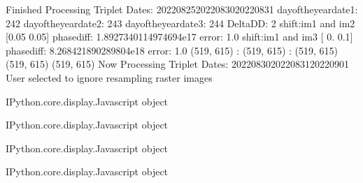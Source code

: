 \documentclass[letterpaper,10pt]{sphinxmanual}
\begin{document}
\begin{sphinxVerbatim}[commandchars=\\\{\}]
Finished Processing Triplet Dates:  20220825\PYGZhy{}20220830\PYGZhy{}20220831
day\PYGZus{}of\PYGZus{}the\PYGZus{}year\PYGZus{}date1:  242
\PYGZhy{}\PYGZhy{}\PYGZhy{}\PYGZhy{}\PYGZhy{}\PYGZhy{}\PYGZhy{}\PYGZhy{}\PYGZhy{}\PYGZhy{}\PYGZhy{}\PYGZhy{}\PYGZhy{}\PYGZhy{}\PYGZhy{}\PYGZhy{}\PYGZhy{}\PYGZhy{}\PYGZhy{}\PYGZhy{}\PYGZhy{}
day\PYGZus{}of\PYGZus{}the\PYGZus{}year\PYGZus{}date2:  243
\PYGZhy{}\PYGZhy{}\PYGZhy{}\PYGZhy{}\PYGZhy{}\PYGZhy{}\PYGZhy{}\PYGZhy{}\PYGZhy{}\PYGZhy{}\PYGZhy{}\PYGZhy{}\PYGZhy{}\PYGZhy{}\PYGZhy{}\PYGZhy{}\PYGZhy{}\PYGZhy{}\PYGZhy{}\PYGZhy{}\PYGZhy{}
day\PYGZus{}of\PYGZus{}the\PYGZus{}year\PYGZus{}date3:  244
\PYGZhy{}\PYGZhy{}\PYGZhy{}\PYGZhy{}\PYGZhy{}\PYGZhy{}\PYGZhy{}\PYGZhy{}\PYGZhy{}\PYGZhy{}\PYGZhy{}\PYGZhy{}\PYGZhy{}\PYGZhy{}\PYGZhy{}\PYGZhy{}\PYGZhy{}\PYGZhy{}\PYGZhy{}\PYGZhy{}\PYGZhy{}
Delta\PYGZus{}DD: 2
shift:im1 and im2 [\PYGZhy{}0.05 \PYGZhy{}0.05] phasediff: 1.8927340114974694e\PYGZhy{}17 error: 1.0
shift:im1 and im3 [ 0.  \PYGZhy{}0.1] phasediff: 8.268421890289804e\PYGZhy{}18 error: 1.0
(519, 615) :  (519, 615) :  (519, 615)
(519, 615)
(519, 615)
Now Processing Triplet Dates:  20220830\PYGZhy{}20220831\PYGZhy{}20220901
 User selected to ignore resampling raster images 



\PYGZlt{}IPython.core.display.Javascript object\PYGZgt{}
\end{sphinxVerbatim}



\begin{sphinxVerbatim}[commandchars=\\\{\}]
\PYGZlt{}IPython.core.display.Javascript object\PYGZgt{}
\end{sphinxVerbatim}



\begin{sphinxVerbatim}[commandchars=\\\{\}]
\PYGZlt{}IPython.core.display.Javascript object\PYGZgt{}
\end{sphinxVerbatim}



\begin{sphinxVerbatim}[commandchars=\\\{\}]
\PYGZlt{}IPython.core.display.Javascript object\PYGZgt{}
\end{sphinxVerbatim}
\end{document}
